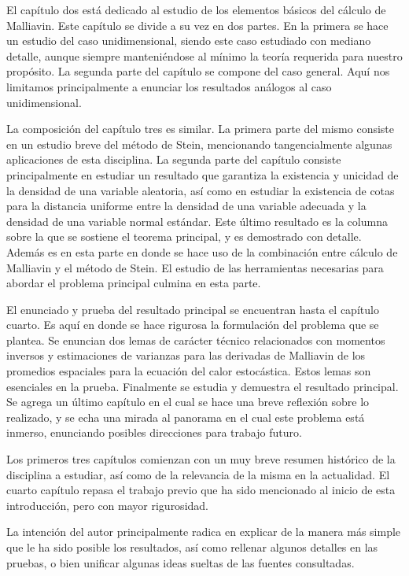 \documentclass[letterpaper,twoside,12pt]{book}
\newcommand{\1}{\mathds{1}}
\theoremstyle{definition}
\theoremstyle{definition}
\theoremstyle{remark}
\theoremstyle{definition}
\theoremstyle{definition}
\theoremstyle{definition}
\theoremstyle{definition}
\theoremstyle{definition}
\begin{document}
El capítulo dos está dedicado al estudio de los elementos básicos del cálculo de Malliavin. Este capítulo se divide a su vez en dos partes. En la primera se hace un estudio del caso unidimensional, siendo este caso estudiado con mediano detalle, aunque siempre manteniéndose al mínimo la teoría requerida para nuestro propósito. La segunda parte del capítulo se compone del caso general. Aquí nos limitamos principalmente a enunciar los resultados análogos al caso unidimensional. 

La composición del capítulo tres es similar. La primera parte del mismo consiste en un estudio breve del método de Stein, mencionando tangencialmente algunas aplicaciones de esta disciplina. La segunda parte del capítulo consiste principalmente en estudiar un resultado que garantiza la existencia y unicidad de la densidad de una variable aleatoria, así como en estudiar la existencia de cotas para la distancia uniforme entre la densidad de una variable adecuada y la densidad de una variable normal estándar. Este último resultado es la columna sobre la que se sostiene el teorema principal, y es demostrado con detalle. Además es en esta parte en donde se hace uso de la combinación entre cálculo de Malliavin y el método de Stein. El estudio de las herramientas necesarias para abordar el problema principal culmina en esta parte.

El enunciado y prueba del resultado principal se encuentran hasta el capítulo cuarto. Es aquí en donde se hace rigurosa la formulación del problema que se plantea. Se enuncian dos lemas de carácter técnico relacionados con momentos inversos y estimaciones de varianzas para las derivadas de Malliavin de los promedios espaciales para la ecuación del calor estocástica. Estos lemas son esenciales en la prueba. Finalmente se estudia y demuestra el resultado principal. Se agrega un último capítulo en el cual se hace una breve reflexión sobre lo realizado, y se echa una mirada al panorama en el cual este problema está inmerso, enunciando posibles direcciones para trabajo futuro.

Los primeros tres capítulos comienzan con un muy breve resumen histórico de la disciplina a estudiar, así como de la relevancia de la misma en la actualidad. El cuarto capítulo repasa el trabajo previo que ha sido mencionado al inicio de esta introducción, pero con mayor rigurosidad. 

La intención del autor principalmente radica en explicar de la manera más simple que le ha sido posible los resultados, así como rellenar algunos detalles en las pruebas, o bien unificar algunas ideas sueltas de las fuentes consultadas. 
\end{document}
